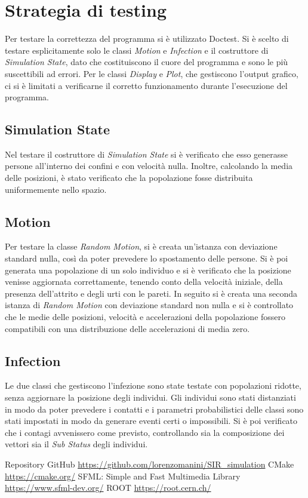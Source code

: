 \documentclass[a4paper,10pt,twocolumn]{article}
\begin{document}
\section{Strategia di testing}
Per testare la correttezza del programma si è utilizzato Doctest. Si è scelto di testare esplicitamente solo le classi \emph{Motion} e \emph{Infection} e il costruttore di \emph{Simulation State}, dato che costituiscono il cuore del programma e sono le più suscettibili ad errori. Per le classi \emph{Display} e \emph{Plot}, che gestiscono l'output grafico, ci si è limitati a verificarne il corretto funzionamento durante l'esecuzione del programma.

\subsection*{Simulation State}
Nel testare il costruttore di \emph{Simulation State} si è verificato che esso generasse persone all'interno dei confini e con velocità nulla. Inoltre, calcolando la media delle posizioni, è stato verificato che la popolazione fosse distribuita uniformemente nello spazio.

\subsection*{Motion}
Per testare la classe \emph{Random Motion}, si è creata un'istanza con deviazione standard nulla, così da poter prevedere lo spostamento delle persone. Si è poi generata una popolazione di un solo individuo e si è verificato che la posizione venisse aggiornata correttamente, tenendo conto della velocità iniziale, della presenza dell'attrito e degli urti con le pareti. In seguito si è creata una seconda istanza di \emph{Random Motion} con deviazione standard non nulla e si è controllato che le medie delle posizioni, velocità e accelerazioni della popolazione fossero compatibili con una distribuzione delle accelerazioni di media zero.

\subsection*{Infection}
Le due classi che gestiscono l'infezione sono state testate con popolazioni ridotte, senza aggiornare la posizione degli individui. Gli individui sono stati distanziati in modo da poter prevedere i contatti e i parametri probabilistici delle classi sono stati impostati in modo da generare eventi certi o impossibili. Si è poi verificato che i contagi avvenissero come previsto, controllando sia la composizione dei vettori sia il \emph{Sub Status} degli individui.

\begin{thebibliography}{9}
     Repository GitHub \url{https://github.com/lorenzomanini/SIR\_simulation}
     CMake \url{https://cmake.org/}
     SFML: Simple and Fast Multimedia Library \url{https://www.sfml-dev.org/}
     ROOT \url{https://root.cern.ch/}
\end{thebibliography}
\end{document}
